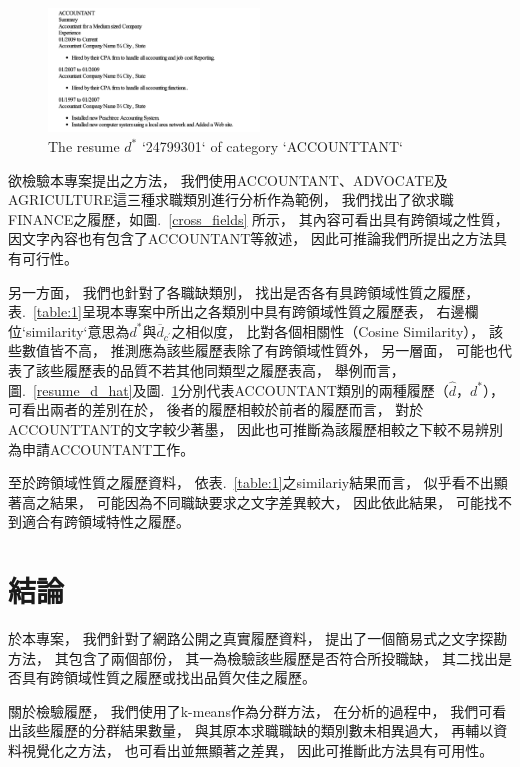 \documentclass[sigconf]{acmart}
\begin{document}
\begin{figure}[t]
    \centerline{\includegraphics[width=0.5\textwidth]{resume_d_star.png}}
    \caption{The resume $d^{*}$ `24799301` of category `ACCOUNTTANT`}
    \label{resume_d_star}
\end{figure}

欲檢驗本專案提出之方法，
我們使用ACCOUNTANT、ADVOCATE及AGRICULTURE這三種求職類別進行分析作為範例，
我們找出了欲求職FINANCE之履歷，如圖.~\ref{cross_fields} 所示，
其內容可看出具有跨領域之性質，
因文字內容也有包含了ACCOUNTANT等敘述，
因此可推論我們所提出之方法具有可行性。

另一方面，
我們也針對了各職缺類別，
找出是否各有具跨領域性質之履歷，
表.~\ref{table:1}呈現本專案中所出之各類別中具有跨領域性質之履歷表，
右邊欄位`similarity`意思為$d^{*}$與$\overline{d}_{c^{'}}$之相似度，
比對各個相關性（Cosine Similarity），
該些數值皆不高，
推測應為該些履歷表除了有跨領域性質外，
另一層面，
可能也代表了該些履歷表的品質不若其他同類型之履歷表高，
舉例而言，
圖.~\ref{resume_d_hat}及圖.~\ref{resume_d_star}分別代表ACCOUNTANT類別的兩種履歷（$\hat{d}$，$d^{*}$），
可看出兩者的差別在於，
後者的履歷相較於前者的履歷而言，
對於ACCOUNTTANT的文字較少著墨，
因此也可推斷為該履歷相較之下較不易辨別為申請ACCOUNTANT工作。

至於跨領域性質之履歷資料，
依表.~\ref{table:1}之similariy結果而言，
似乎看不出顯著高之結果，
可能因為不同職缺要求之文字差異較大，
因此依此結果，
可能找不到適合有跨領域特性之履歷。

\section{結論}

於本專案，
我們針對了網路公開之真實履歷資料，
提出了一個簡易式之文字探勘方法，
其包含了兩個部份，
其一為檢驗該些履歷是否符合所投職缺，
其二找出是否具有跨領域性質之履歷或找出品質欠佳之履歷。

關於檢驗履歷，
我們使用了k-means作為分群方法，
在分析的過程中，
我們可看出該些履歷的分群結果數量，
與其原本求職職缺的類別數未相異過大，
再輔以資料視覺化之方法，
也可看出並無顯著之差異，
因此可推斷此方法具有可用性。
\end{document}
